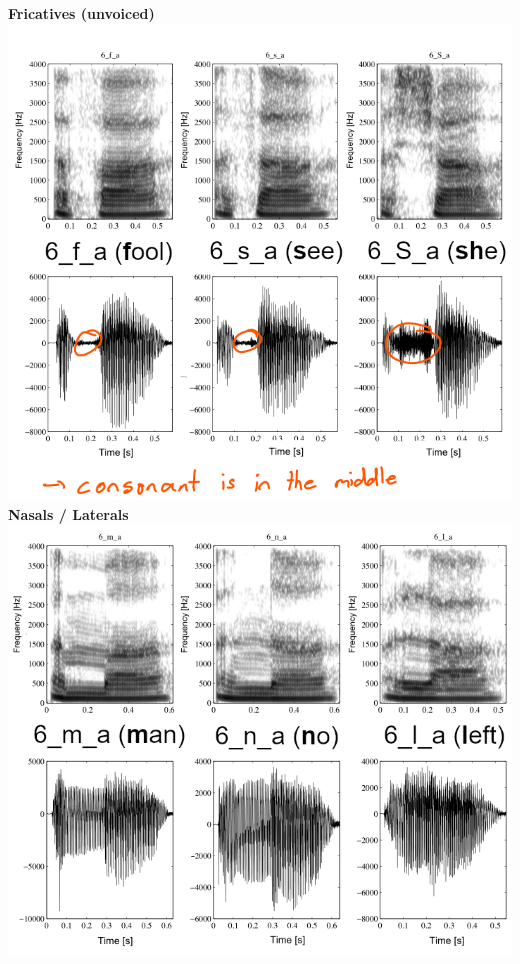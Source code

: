 \hfill
\begin{minipage}[t]{0.31\textwidth}
\centering
\textbf{Fricatives (unvoiced)}
\includegraphics[width=\textwidth, trim={0 0 0 3mm}, clip]{img/fricatives_unvoiced}
\textbf{Nasals / Laterals}
\includegraphics[width=\textwidth]{img/nasals_laterals}
\end{minipage}
\hfill
